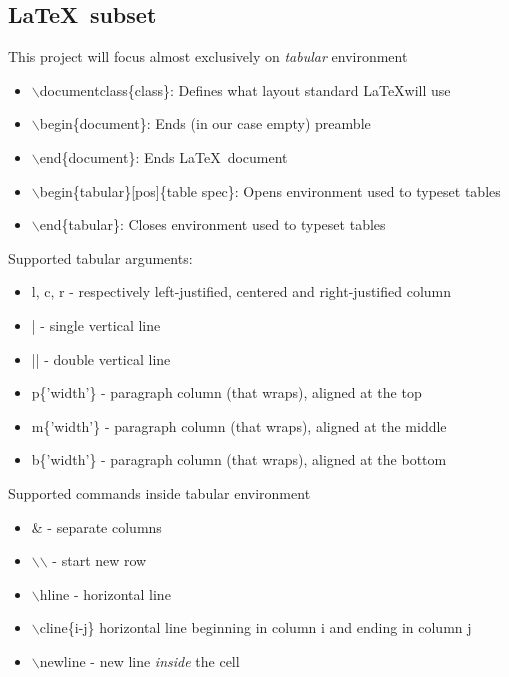 \documentclass[12pt]{article}
\begin{document}
\subsection{\LaTeX \, subset}
This project will focus almost exclusively on \emph{tabular} environment \\
\begin{itemize}
    \item $\backslash$documentclass\{class\}: Defines what layout standard \LaTeX will use 
    \item $\backslash$begin\{document\}: Ends (in our case empty) preamble
    \item $\backslash$end\{document\}: Ends \LaTeX \, document
    \item $\backslash$begin\{tabular\}[pos]\{table spec\}: Opens environment used to typeset tables 
    \item $\backslash$end\{tabular\}: Closes environment used to typeset tables 
\end{itemize}
Supported tabular arguments:
\begin{itemize}
    \item l, c, r - respectively left-justified, centered and right-justified column
    \item  | - single vertical line 
    \item  || - double vertical line 
    \item p\{'width'\} - paragraph column (that wraps), aligned at the top 
    \item m\{'width'\} - paragraph column (that wraps), aligned at the middle 
    \item b\{'width'\} - paragraph column (that wraps), aligned at the bottom 
\end{itemize}

Supported commands inside tabular environment
\begin{itemize}
    \item \& - separate columns
    \item $\backslash$$\backslash$ - start new row
    \item $\backslash$hline - horizontal line
    \item $\backslash$cline\{i-j\} horizontal line beginning in column i and ending in column j
    \item $\backslash$newline - new line \emph{inside} the cell
\end{itemize}
\end{document}
